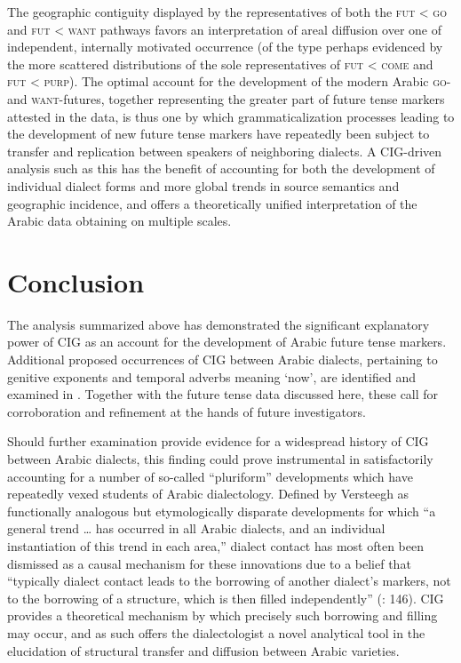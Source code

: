 \documentclass[output=paper]{langsci/langscibook}
\begin{document}
The geographic contiguity displayed by the representatives of both the \textsc{fut} < \textsc{go} and \textsc{fut} < \textsc{want} pathways favors an interpretation of areal diffusion over one of independent, internally motivated occurrence (of the type perhaps evidenced by the more scattered distributions of the sole representatives of \textsc{fut} < \textsc{come} and \textsc{fut} < \textsc{purp}). The optimal account for the development of the modern Arabic \textsc{go-} and \textsc{want-}futures, together representing the greater part of future tense markers attested in the data, is thus one by which grammaticalization processes leading to the development of new future tense markers have repeatedly been subject to transfer and replication between speakers of neighboring dialects. A CIG-driven analysis such as this has the benefit of accounting for both the development of individual dialect forms and more global trends in source semantics and geographic incidence, and offers a theoretically unified interpretation of the Arabic data obtaining on multiple scales.

\section{ Conclusion}

The analysis summarized above has demonstrated the significant explanatory power of CIG as an account for the development of Arabic future tense markers. Additional proposed occurrences of CIG between Arabic dialects, pertaining to genitive exponents and temporal adverbs meaning ‘now’, are identified and examined in \citet{Leddy-Cecere2018}. Together with the future tense data discussed here, these call for corroboration and refinement at the hands of future investigators.

Should further examination provide evidence for a widespread history of CIG between Arabic dialects, this finding could prove instrumental in satisfactorily accounting for a number of so-called “pluriform” developments which have repeatedly vexed students of Arabic dialectology. Defined by Versteegh as functionally analogous but etymologically disparate developments for which “a general trend … has occurred in all Arabic dialects, and an individual instantiation of this trend in each area,” dialect contact has most often been dismissed as a causal mechanism for these innovations due to a belief that “typically dialect contact leads to the borrowing of another dialect’s markers, not to the borrowing of a structure, which is then filled independently” (\citeyear{Versteegh2014book}: 146). CIG provides a theoretical mechanism by which precisely such borrowing and filling may occur, and as such offers the dialectologist a novel analytical tool in the elucidation of structural transfer and diffusion between Arabic varieties.
\end{document}
